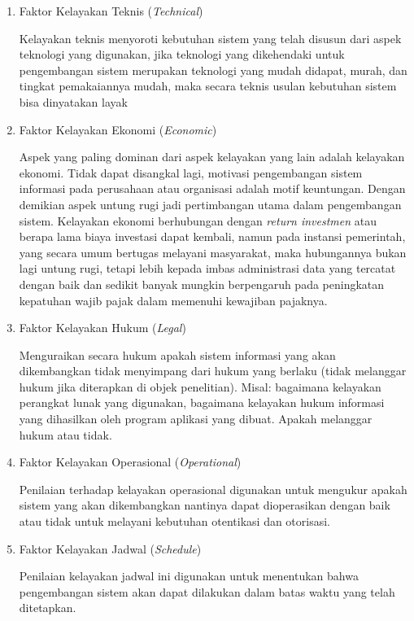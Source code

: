 \documentclass[pdftex,12pt, oneside]{article}
\begin{document}
\begin{enumerate}
	\item Faktor Kelayakan Teknis (\textit{Technical})
	
Kelayakan teknis menyoroti kebutuhan sistem yang telah disusun dari aspek teknologi yang digunakan, jika teknologi yang dikehendaki untuk pengembangan sistem merupakan teknologi yang mudah didapat, murah, dan tingkat pemakaiannya mudah, maka secara teknis usulan kebutuhan sistem bisa dinyatakan layak	
	
	\item Faktor Kelayakan Ekonomi (\textit{Economic})
	
Aspek yang paling dominan dari aspek kelayakan yang lain adalah kelayakan ekonomi. Tidak dapat disangkal lagi, motivasi pengembangan sistem informasi pada perusahaan atau organisasi adalah motif keuntungan. Dengan demikian aspek untung rugi jadi pertimbangan utama dalam pengembangan sistem. Kelayakan ekonomi berhubungan dengan \textit{return investmen} atau berapa lama biaya investasi dapat kembali, namun pada instansi pemerintah, yang secara umum bertugas melayani masyarakat, maka hubungannya bukan lagi untung rugi, tetapi lebih kepada imbas administrasi data yang tercatat dengan baik dan sedikit banyak mungkin berpengaruh pada peningkatan kepatuhan wajib pajak dalam memenuhi kewajiban pajaknya.	

	\item Faktor Kelayakan Hukum (\textit{Legal})
	
Menguraikan secara hukum apakah sistem informasi yang akan dikembangkan tidak menyimpang dari hukum yang berlaku (tidak melanggar hukum jika diterapkan di objek penelitian). Misal: bagaimana kelayakan perangkat lunak yang digunakan, bagaimana kelayakan hukum informasi yang dihasilkan oleh program aplikasi yang dibuat. Apakah melanggar hukum atau tidak.	
	
	\item Faktor Kelayakan Operasional (\textit{Operational})

Penilaian terhadap kelayakan operasional digunakan untuk mengukur apakah sistem yang akan dikembangkan nantinya dapat dioperasikan dengan baik atau tidak untuk melayani kebutuhan otentikasi dan otorisasi.	
	
	\item Faktor Kelayakan Jadwal (\textit{Schedule})
	
Penilaian kelayakan jadwal ini digunakan untuk menentukan bahwa pengembangan sistem akan dapat dilakukan dalam batas waktu yang telah ditetapkan.	
	
\end{enumerate}
\end{document}
